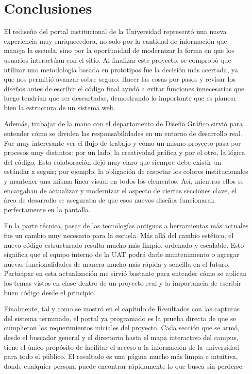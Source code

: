 \section{Conclusiones}

El rediseño del portal institucional de la Universidad representó una nueva experiencia muy enriquecedora, no solo por la cantidad de información que maneja la escuela, sino por la oportunidad de modernizar la forma en que los usuarios interactúan con el sitio. Al finalizar este proyecto, se comprobó que utilizar una metodología basada en prototipos fue la decisión más acertada, ya que nos permitió avanzar sobre seguro. Hacer las cosas por pasos y revisar los diseños antes de escribir el código final ayudó a evitar funciones innecesarias que luego tendrían que ser descartadas, demostrando lo importante que es planear bien la estructura de un sistema web.

Además, trabajar de la mano con el departamento de Diseño Gráfico sirvió para entender cómo se dividen las responsabilidades en un entorno de desarrollo real. Fue muy interesante ver el flujo de trabajo y cómo un mismo proyecto pasa por procesos muy distintos: por un lado, la creatividad gráfica y por el otro, la lógica del código. Esta colaboración dejó muy claro que siempre debe existir un estándar a seguir; por ejemplo, la obligación de respetar los colores institucionales y mantener una misma línea visual en todos los elementos. Así, mientras ellos se encargaban de actualizar y modernizar el aspecto de ciertas secciones clave, el área de desarrollo se aseguraba de que esos nuevos diseños funcionaran perfectamente en la pantalla.

En la parte técnica, pasar de las tecnologías antiguas a herramientas más actuales fue un cambio muy necesario para la escuela. Más allá del cambio estético, el nuevo código estructurado resulta mucho más limpio, ordenado y escalable. Esto significa que el equipo interno de la UAT podrá darle mantenimiento o agregar nuevas funcionalidades de manera mucho más rápida y sencilla en el futuro. Participar en esta actualización me sirvió bastante para entender cómo se aplican los temas vistos en clase dentro de un proyecto real y la importancia de escribir buen código desde el principio.

Finalmente, tal y como se mostró en el capítulo de Resultados con las capturas del sistema terminado, el portal ya programado es la prueba directa de que se cumplieron los requerimientos iniciales del proyecto. Cada sección que se armó, desde el buscador general y el directorio hasta el mapa interactivo del campus, tiene el único propósito de facilitar el acceso a la información de la universidad para todo el público. El resultado es una página mucho más limpia e intuitiva, donde cualquier persona puede encontrar rápidamente lo que busca sin perderse.

